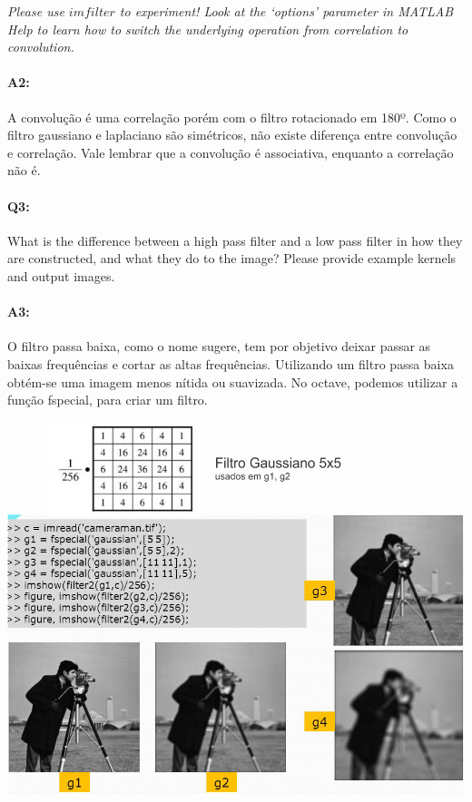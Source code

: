 \emph{Please use \href{https://www.mathworks.com/help/images/ref/imfilter.html}{$imfilter$} to experiment! Look at the `options' parameter in MATLAB Help to learn how to switch the underlying operation from correlation to convolution.}

\paragraph{A2:} A convolução é uma correlação porém com o filtro rotacionado em 180º. Como o filtro gaussiano e laplaciano são simétricos, não existe diferença entre convolução e correlação. Vale lembrar que a convolução é associativa, enquanto a correlação não é. 




\pagebreak
\paragraph{Q3:} What is the difference between a high pass filter and a low pass filter in how they are constructed, and what they do to the image? Please provide example kernels and output images.

\paragraph{A3:} O filtro passa baixa, como o nome sugere, tem por objetivo deixar passar as baixas frequências e cortar as altas frequências. Utilizando  um  filtro  passa  baixa  obtém-se  uma 
imagem menos nítida ou suavizada. No octave, podemos utilizar a função fspecial, para criar um filtro.
\begin{center}
\includegraphics[scale=1.1]{questions/filter-low-pass.png}
\end{center}
